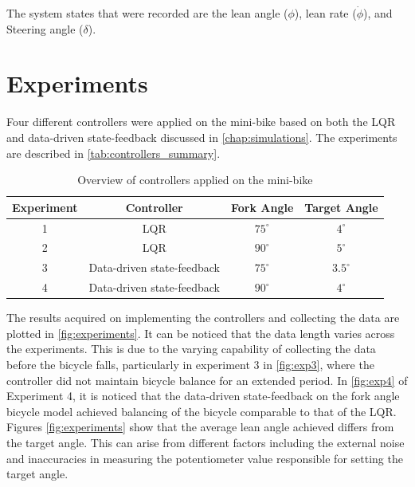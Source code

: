 The system states that were recorded are the lean angle ($\phi$), lean rate ($\dot{\phi}$), and Steering angle ($\delta$).

\section{Experiments}
Four different controllers were applied on the mini-bike based on both the LQR and data-driven state-feedback discussed in \autoref{chap:simulations}. The experiments are described in \autoref{tab:controllers_summary}.

\begin{table}[H]
	\centering
	\begin{tabular}{|c|c|c|c|}
		\hline
		\textbf{Experiment} & \textbf{Controller} & \textbf{Fork Angle}  & \textbf{Target Angle} \\ \hline
		1 & LQR & $75^\circ$  & $4^\circ$ \\ \hline
		2 & LQR & $90^\circ$  &  $5^\circ$ \\ \hline
		3 & Data-driven state-feedback & $75^\circ$  &  $3.5^\circ$ \\ \hline
		4 & Data-driven state-feedback & $90^\circ$  &  $4^\circ$ \\ \hline
	\end{tabular}
	\caption{Overview of controllers applied on the mini-bike}
	\label{tab:controllers_summary}
\end{table}

The results acquired on implementing the controllers and collecting the data are plotted in \autoref{fig:experiments}. It can be noticed that the data length varies across the experiments. This is due to the varying capability of collecting the data before the bicycle falls, particularly in experiment 3 in \autoref{fig:exp3}, where the controller did not maintain bicycle balance for an extended period. In \autoref{fig:exp4} of Experiment 4, it is noticed that the data-driven state-feedback on the fork angle bicycle model achieved balancing of the bicycle comparable to that of the LQR. Figures \ref{fig:experiments} show that the average lean angle achieved differs from the target angle. This can arise from different factors including the external noise and inaccuracies in measuring the potentiometer value responsible for setting the target angle.

